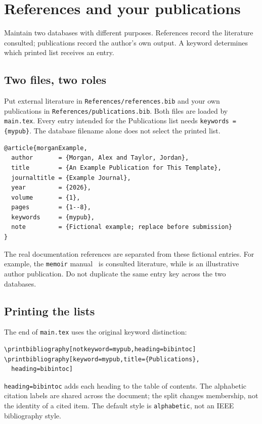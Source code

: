 
\chapter{References and your publications}\label{chap:05}
\renewcommand{\FigLocation}{Chapters/Chapter_5/fig/}
\renewcommand{\ChapLocation}{Chapters/Chapter_5/}
\begin{absbox}
Maintain two databases with different purposes. References record the literature consulted; publications record the author’s own output. A keyword determines which printed list receives an entry.
\end{absbox}


\section{Two files, two roles}
Put external literature in \texttt{References/references.bib} and your own
publications in \texttt{References/publications.bib}. Both files are loaded by
\texttt{main.tex}. Every entry intended for the Publications list needs
\texttt{keywords = \{mypub\}}. The database filename alone does not select
the printed list.
\begin{lstlisting}[language={}]
@article{morganExample,
  author       = {Morgan, Alex and Taylor, Jordan},
  title        = {An Example Publication for This Template},
  journaltitle = {Example Journal},
  year         = {2026},
  volume       = {1},
  pages        = {1--8},
  keywords     = {mypub},
  note         = {Fictional example; replace before submission}
}
\end{lstlisting}
The real documentation references are separated from these fictional entries.
For example, the \texttt{memoir} manual~\cite{memoirManual} is consulted
literature, while \cite{morganExample} is an illustrative author publication.
Do not duplicate the same entry key across the two databases.

\section{Printing the lists}
The end of \texttt{main.tex} uses the original keyword distinction:
\begin{lstlisting}
\printbibliography[notkeyword=mypub,heading=bibintoc]
\printbibliography[keyword=mypub,title={Publications},
  heading=bibintoc]
\end{lstlisting}
\texttt{heading=bibintoc} adds each heading to the table of contents. The
alphabetic citation labels are shared across the document; the split changes
membership, not the identity of a cited item. The default style is
\texttt{alphabetic}, not an IEEE bibliography style.

